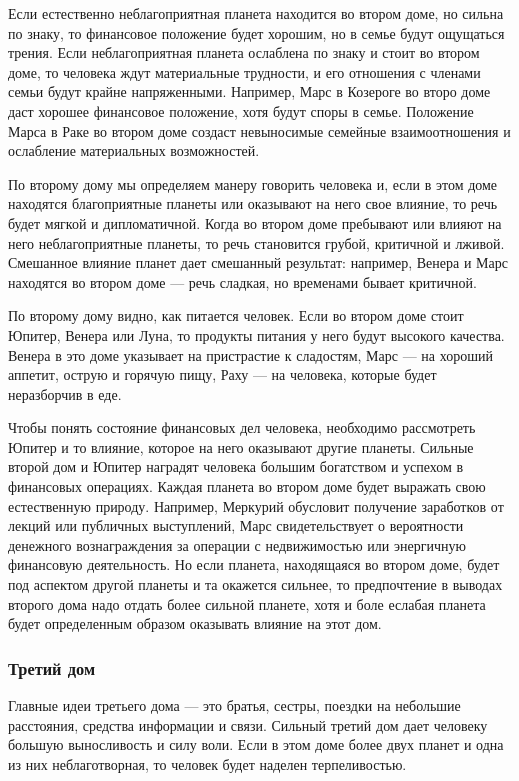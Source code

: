 Если естественно неблагоприятная планета находится во втором доме, но сильна по знаку, то финансовое положение будет хорошим, но в семье будут ощущаться трения. Если неблагоприятная планета ослаблена по знаку и стоит во втором доме, то человека ждут материальные трудности, и его отношения с членами семьи будут крайне напряженными. Например, Марс в Козероге во второ доме даст хорошее финансовое положение, хотя будут споры в семье. Положение Марса в Раке во втором доме создаст невыносимые семейные взаимоотношения и ослабление материальных возможностей.

По второму дому мы определяем манеру говорить человека и, если в этом доме находятся благоприятные планеты или оказывают на него свое влияние, то речь будет мягкой и дипломатичной. Когда во втором доме пребывают или влияют на него неблагоприятные планеты, то речь становится грубой, критичной и лживой. Смешанное влияние планет дает смешанный результат: например, Венера и Марс находятся во втором доме --- речь сладкая, но временами бывает критичной.

По второму дому видно, как питается человек. Если во втором доме стоит Юпитер, Венера или Луна, то продукты питания у него будут высокого качества. Венера в это доме указывает на пристрастие к сладостям, Марс --- на хороший аппетит, острую и горячую пищу, Раху --- на человека, которые будет неразборчив в еде.

Чтобы понять состояние финансовых дел человека, необходимо рассмотреть Юпитер и то влияние, которое на него оказывают другие планеты. Сильные второй дом и Юпитер наградят человека большим богатством и успехом в финансовых операциях. Каждая планета во втором доме будет выражать свою естественную природу. Например, Меркурий обусловит получение заработков от лекций или публичных выступлений, Марс свидетельствует о вероятности денежного вознаграждения за операции с недвижимостью или энергичную финансовую деятельность. Но если планета, находящаяся во втором доме, будет под аспектом другой планеты и та окажется сильнее, то предпочтение в выводах второго дома надо отдать более сильной планете, хотя и боле еслабая планета будет определенным образом оказывать влияние на этот дом.


\subsubsection*{Третий дом}

Главные идеи третьего дома --- это братья, сестры, поездки на небольшие расстояния, средства информации и связи. Сильный третий дом дает человеку большую выносливость и силу воли. Если в этом доме более двух планет и одна из них неблаготворная, то человек будет наделен терпеливостью.

